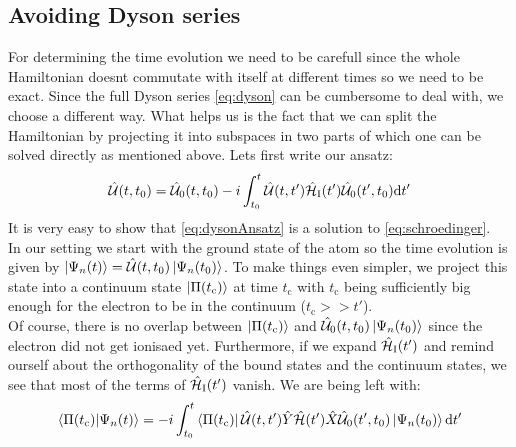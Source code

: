 \subsection{Avoiding Dyson series}
For determining the time evolution we need to be carefull since the whole Hamiltonian doesnt commutate with itself at different times so we need to be exact. 
Since the full Dyson series \eqref{eq:dyson} can be cumbersome to deal with, we choose a different way. 
What helps us is the fact that we can split the Hamiltonian by projecting it into subspaces in two parts of which one can be solved directly as mentioned above. 
Lets first write our ansatz:
\begin{equation}
    \hat{\mathcal{U}}(t,t_0)=\hat{\mathcal{U}}_0(t,t_0)-i\int_{t_0}^{t} \hat{\mathcal{U}}(t,t')\hat{\mathcal{H}}_{\mathrm{I}}(t')\hat{\mathcal{U}}_0(t',t_0) \mathrm{d} t'       \label{eq:dysonAnsatz}
\end{equation}
It is very easy to show that \eqref{eq:dysonAnsatz} is a solution to \eqref{eq:schroedinger}.\\
In our setting we start with the ground state of the atom so the time evolution is given by $\ket{\Psi_n(t)}=\hat{\mathcal{U}}(t,t_0)\ket{\Psi_n(t_0)}$.
To make things even simpler, we project this state into a continuum state $\ket{\Pi(t_{\mathrm{c}})}$ at time $t_{\mathrm{c}}$ with $t_{\mathrm{c}}$ being sufficiently big enough for the electron to be in the continuum ($t_{\mathrm{c}} >> t'$).\\
Of course, there is no overlap between $\ket{\Pi(t_{\mathrm{c}})}$ and $\hat{\mathcal{U}}_0(t,t_0)\ket{\Psi_n(t_0)}$ since the electron did not get ionisaed yet. 
Furthermore, if we expand $\hat{\mathcal{H}}_{\mathrm{I}}(t')$ and remind ourself about the orthogonality of the bound states and the continuum states, we see that most of the terms of $\hat{\mathcal{H}}_{\mathrm{I}}(t')$ vanish.
We are being left with:
\begin{equation}
    \braket{\Pi(t_{\mathrm{c}})|\Psi_n(t)} = -i \int_{t_0}^{t} \bra{\Pi(t_{\mathrm{c}})}\hat{\mathcal{U}}(t,t')\hat{Y}\hat{\mathcal{H}}(t')\hat{X}\hat{\mathcal{U}}_0(t',t_0)\ket{\Psi_n(t_0)} \mathrm{d} t' \label{eq:smatrixlike}
\end{equation}




